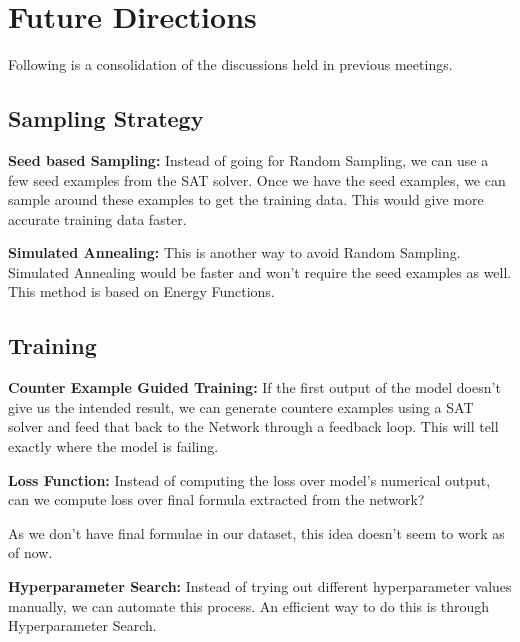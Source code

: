 \section{Future Directions}
\noindent Following is a consolidation of the discussions held in previous meetings.

\subsection{Sampling Strategy}
\noindent\textbf{Seed based Sampling:}
Instead of going for Random Sampling, we can use a few seed examples from the SAT solver. 
Once we have the seed examples, we can sample around these examples to get the training data.
This would give more accurate training data faster.

\smallskip
\noindent\textbf{Simulated Annealing:} 
This is another way to avoid Random Sampling. Simulated Annealing would be faster and 
won't require the seed examples as well. This method is based on Energy Functions.

\subsection{Training}
\noindent\textbf{Counter Example Guided Training:} If the first output of the model doesn't give us the 
intended result, we can generate countere examples using a SAT solver and feed that back to the Network
 through a feedback loop. This will tell exactly where the model is failing.

 \smallskip
 \noindent\textbf{Loss Function:} Instead of computing the loss over model's numerical output, 
 can we compute loss over final formula extracted from the network? 

 \noindent As we don't have final formulae in our dataset, this idea doesn't seem to work as of now.

 \smallskip
\noindent\textbf{Hyperparameter Search:} Instead of trying out different hyperparameter values manually, 
we can automate this process. An efficient way to do this is through Hyperparameter Search.
